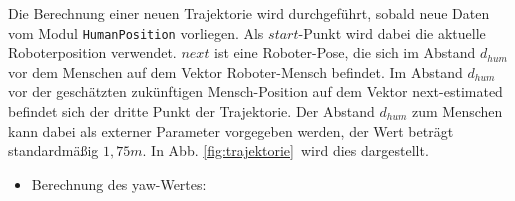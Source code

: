 Die Berechnung einer neuen Trajektorie wird durchgeführt, sobald neue Daten vom Modul \lstinline{HumanPosition} vorliegen.
Als $start$-Punkt wird dabei die aktuelle Roboterposition verwendet.
$next$ ist eine Roboter-Pose, die sich im Abstand $d_{hum}$ vor dem Menschen auf dem Vektor Roboter-Mensch befindet.
Im Abstand $d_{hum}$ vor der geschätzten zukünftigen Mensch-Position auf dem Vektor next-estimated befindet sich der dritte Punkt der Trajektorie.
Der Abstand $d_{hum}$ zum Menschen kann dabei als externer Parameter vorgegeben werden, der Wert beträgt standardmäßig $1,75m$.
In Abb. \ref{fig:trajektorie}\ wird dies dargestellt.



\begin{itemize}
  \item Berechnung des yaw-Wertes: 

\end{itemize}


